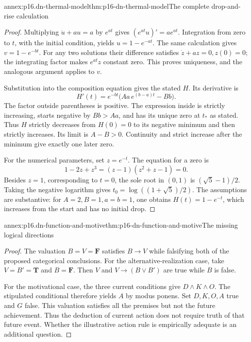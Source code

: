 \begin{annexitem}{annex:p16.dn-thermal-model}{thm:p16-dn-thermal-model}{The complete drop-and-rise calculation}
\begin{proof}
Multiplying \(\dot u+au=a\)
by \(e^{at}\) gives
\((e^{at}u)'=ae^{at}\).
Integration from zero to
\(t\), with the initial
condition, yields
\(u=1-e^{-at}\).
The same calculation
gives \(v=1-e^{-bt}\).
For any two solutions
their difference satisfies
\(\dot z+az=0,z(0)=0\);
the integrating factor
makes \(e^{at}z\)
constant zero. This
proves uniqueness, and
the analogous argument
applies to \(v\).

Substitution into the
composition equation
gives the stated \(H\).
Its derivative is
\[
 H'(t)=e^{-bt}
           \bigl(Aa\,e^{(b-a)t}-Bb\bigr).
\]
The factor outside
parentheses is positive.
The expression inside
is strictly increasing,
starts negative by
\(Bb>Aa\), and has
its unique zero at
\(t_*\) as stated.
Thus \(H\) strictly
decreases from \(H(0)=0\)
to its negative minimum
and then strictly
increases. Its limit
is \(A-B>0\).
Continuity and strict
increase after the
minimum give exactly
one later zero.

For the numerical
parameters, set \(z=e^{-t}\).
The equation for a zero
is
\[
 1-2z+z^3=(z-1)(z^2+z-1)=0 .
\]
Besides \(z=1\), corresponding
to \(t=0\), the sole root
in \((0,1)\) is
\((\sqrt5-1)/2\).
Taking the negative
logarithm gives
\(t_0=\log((1+\sqrt5)/2)\).
The assumptions are
substantive: for
\(A=2,B=1,a=b=1\),
one obtains
\(H(t)=1-e^{-t}\),
which increases from
the start and has
no initial drop.
\end{proof}
\end{annexitem}

\begin{annexitem}{annex:p16.dn-function-and-motive}{thm:p16-dn-function-and-motive}{The missing logical directions}
\begin{proof}
The valuation \(B=V=\mathbf F\)
satisfies \(B\to V\)
while falsifying both
of the proposed categorical
conclusions. For the
alternative-realization case,
take \(V=B'=\mathbf T\)
and \(B=\mathbf F\).
Then \(V\) and
\(V\to(B\lor B')\)
are true while \(B\)
is false.

For the motivational
case, the three current
conditions give
\(D\land K\land O\).
The stipulated conditional
therefore yields \(A\)
by modus ponens.
Set \(D,K,O,A\)
true and \(G\)
false. This valuation
satisfies all the
premises but not the
future achievement.
Thus the deduction
of current action
does not require
truth of that future
event. Whether the
illustrative action
rule is empirically
adequate is an
additional question.
\end{proof}
\end{annexitem}

